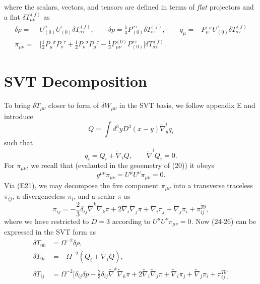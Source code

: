 \documentclass[10pt,letterpaper]{article}
\begin{document}
where the scalars, vectors, and tensors are defined in terms of \emph{flat} projectors and a flat $\delta T_{\mu\nu}^{(f)}$ as
\begin{align}
	\delta \rho =&{}  U_{(0)}^\sigma U_{(0)}^\tau \delta T^{(f)}_{\sigma\tau},\qquad \delta p =  \frac{1}{3} P_{(0)}^{\sigma\tau} \delta T^{(f)}_{\sigma\tau},\qquad
	q_\mu = -P_\mu{}^\sigma U_{(0)}^{\tau}\delta T^{(f)}_{\sigma\tau}\nonumber\\
	\pi_{\mu\nu} =&{} \bigg[ \frac12 P_\mu{}^\sigma P_\nu{}^\tau + \frac12 P_{\nu}{}^\sigma  P_\mu{}^\tau- \frac13 P_{\mu\nu}^{(0)}P_{(0)}^{\sigma\tau}\bigg]\delta 
T_{\sigma\tau}^{(f)}.
\end{align}
 
\section*{SVT Decomposition}
To bring $\delta T_{\mu\nu}$ closer to form of $\delta W_{\mu\nu}$ in the SVT basis, we follow appendix E and introduce
\begin{equation}
	Q = \int d^3y D^3(x-y) \tilde\nabla^i_y q_i
\end{equation}
such that
\begin{equation}
	 q_i = Q_i + \tilde\nabla_i Q,\qquad \tilde\nabla^i Q_i = 0.
\end{equation}
For $\pi_{\mu\nu}$, we recall that (evalauted in the geoemetry of (20)) it obeys 
\begin{equation}
	g^{\mu\nu}\pi_{\mu\nu} = U^\mu U^\nu \pi_{\mu\nu} = 0.
\end{equation} 
Via (E21), we may decompose the five component $\pi_{\mu\nu}$ into a transverse traceless $\pi_{ij}$, a divergenceless $\pi_i$, and a scalar $\pi$ as
\begin{equation}
	\pi_{ij} = -\frac{2}{3} \delta_{ij}\tilde\nabla^k \tilde\nabla_k \pi  + 2\tilde\nabla_i\tilde\nabla_j \pi + \tilde\nabla_i \pi_j + \tilde\nabla_j \pi_i + \pi_{ij}^{T\theta},
\end{equation}
where we have restricted to $D=3$ according to $U^\mu U^\nu \pi_{\mu\nu} = 0$. Now (24-26) can be expressed in the SVT form as
\begin{align}
\delta T_{00}  &= \Omega^{-2} \delta \rho,
\nonumber\\	
\delta T_{0i} &= -\Omega^{-2} ( Q_i + \tilde\nabla_i Q),
\nonumber\\	
\delta T_{ij}  &= \Omega^{-2}\bigg[ \delta_{ij} \delta p -\frac{2}{3} \delta_{ij}\tilde\nabla^k \tilde\nabla_k \pi + 2\tilde\nabla_i\tilde\nabla_j \pi + \tilde\nabla_i \pi_j + \tilde\nabla_j \pi_i + \pi_{ij}^{T\theta}\bigg]
\end{align}
\end{document}
